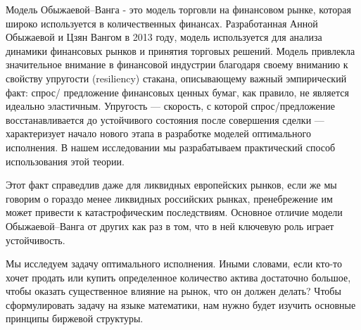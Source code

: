 \introduction %

Модель Обыжаевой--Ванга - это модель торговли на финансовом рынке, которая широко используется в количественных финансах.
Разработанная Анной Обыжаевой и Цзян Вангом в 2013 году, модель используется для анализа динамики финансовых
рынков и принятия торговых решений. Модель привлекла значительное внимание в финансовой индустрии
благодаря своему вниманию к свойству упругости (resiliency) стакана, описывающему важный эмпирический факт: спрос/
предложение финансовых ценных бумаг, как правило, не является идеально эластичным. Упругость --- скорость, с которой спрос/предложение
восстанавливается до устойчивого состояния после совершения сделки --- характеризует начало нового этапа в разработке
моделей оптимального исполнения. В нашем исследовании мы разрабатываем практический способ использования этой теории.
\par
Этот факт справедлив даже для ликвидных европейских рынков, если же мы говорим о гораздо менее ликвидных российских рынках,
пренебрежение им может привести к катастрофическим последствиям. Основное отличие модели Обыжаевой--Ванга  от других как раз
в том, что в ней ключевую роль играет устойчивость.
\par
Мы исследуем задачу оптимального исполнения. Иными словами, если кто-то хочет продать или купить определенное количество актива
достаточно большое, чтобы оказать существенное влияние на рынок, что он должен делать? Чтобы сформулировать задачу на языке
математики, нам нужно будет изучить основные принципы биржевой структуры.


